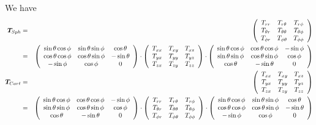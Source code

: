 We have
\begin{eqnarray}
{\bm T}_{\tiny Sph}&=&
\left(
\begin{array}{ccc}
T_{rr}       & T_{r\theta}      & T_{r\phi} \\
T_{\theta r} & T_{\theta\theta} & T_{\theta\phi} \\
T_{\phi r}   & T_{\phi \theta}  & T_{\phi\phi}
\end{array}
\right) \nonumber\\
&=&
\left(
\begin{array}{ccc}
\sin\theta \cos\phi & \sin\theta \sin\phi & \cos\theta \\
\cos\theta \cos\phi & \cos\theta \sin\phi & -\sin\theta \\
-\sin\phi & \cos\phi & 0 
\end{array}
\right)
\cdot
\left(
\begin{array}{ccc}
T_{xx} & T_{xy} & T_{xz} \\
T_{yx} & T_{yy} & T_{yz} \\
T_{zx} & T_{zy} & T_{zz} 
\end{array}
\right)
\cdot
\left(
\begin{array}{ccc}
\sin\theta\cos\phi & \cos\theta\cos\phi & -\sin\phi \\
\sin\theta\sin\phi & \cos\theta\sin\phi & \cos\phi \\
\cos\theta & -\sin\theta & 0
\end{array}
\right) 
\nonumber\\
{\bm T}_{\tiny Cart} &=&
\left(
\begin{array}{ccc}
T_{xx} & T_{xy} & T_{xz} \\
T_{yx} & T_{yy} & T_{yz} \\
T_{zx} & T_{zy} & T_{zz} 
\end{array}
\right) \nonumber\\
&=&
\left(
\begin{array}{ccc}
\sin\theta\cos\phi & \cos\theta\cos\phi & -\sin\phi \\
\sin\theta\sin\phi & \cos\theta\sin\phi & \cos\phi \\
\cos\theta & -\sin\theta & 0
\end{array}
\right)
\cdot
\left(
\begin{array}{ccc}
T_{rr}       & T_{r\theta}      & T_{r\phi} \\
T_{\theta r} & T_{\theta\theta} & T_{\theta\phi} \\
T_{\phi r}   & T_{\phi \theta}  & T_{\phi\phi}
\end{array}
\right)
\cdot
\left(
\begin{array}{ccc}
\sin\theta \cos\phi & \sin\theta \sin\phi & \cos\theta \\
\cos\theta \cos\phi & \cos\theta \sin\phi & -\sin\theta \\
-\sin\phi & \cos\phi & 0 
\end{array}
\right)
\end{eqnarray}
